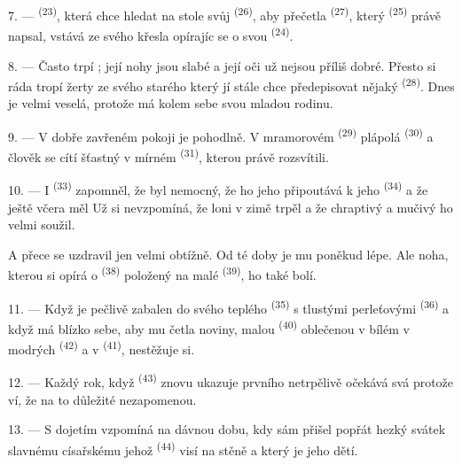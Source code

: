 7. ---  \textsuperscript{(23)}, která chce hledat na stole svůj
 \textsuperscript{(26)}, aby přečetla 
\textsuperscript{(27)}, který  \textsuperscript{(25)} právě napsal, vstává ze
svého křesla opírajíc se o svou  \textsuperscript{(24)}.

8. --- Často trpí ; její nohy jsou
slabé a její oči už nejsou příliš dobré. Přesto si ráda tropí žerty ze svého starého
 který jí stále chce předepisovat nějaký  \textsuperscript{(28)}.
Dnes je velmi veselá, protože má kolem sebe svou mladou rodinu.

9. --- V dobře zavřeném pokoji je pohodlně. V mramorovém  \textsuperscript{(29)}
plápolá  \textsuperscript{(30)} a člověk se cítí šťastný v mírném
  \textsuperscript{(31)}, kterou právě rozsvítili.

\VUsaut{4.2mm}
\VUsaut{3.0mm}

10. --- I  \textsuperscript{(33)} zapomněl, že byl nemocný, že ho jeho
 připoutává k jeho  \textsuperscript{(34)} a že
ještě včera měl  Už si nevzpomíná, že loni v zimě trpěl
 a že chraptivý a mučivý  ho velmi soužil.

A přece se uzdravil jen velmi obtížně. Od té doby je mu poněkud lépe. Ale noha, kterou si
opírá o  \textsuperscript{(38)} položený na malé 
\textsuperscript{(39)}, ho také bolí.

11. --- Když je pečlivě zabalen do svého teplého  \textsuperscript{(35)} s
tlustými perleťovými  \textsuperscript{(36)} a když má blízko sebe, aby mu
četla noviny, malou  \textsuperscript{(40)} oblečenou v bílém  v
modrých  \textsuperscript{(42)} a v  \textsuperscript{(41)},
nestěžuje si.

12. --- Každý rok, když  \textsuperscript{(43)} znovu ukazuje
 prvního  netrpělivě očekává svá 
protože ví, že na to důležité  nezapomenou.

13. --- S dojetím vzpomíná na dávnou dobu, kdy sám přišel popřát hezký svátek slavnému
císařskému  jehož  \textsuperscript{(44)} visí na stěně a
který je  jeho dětí.
